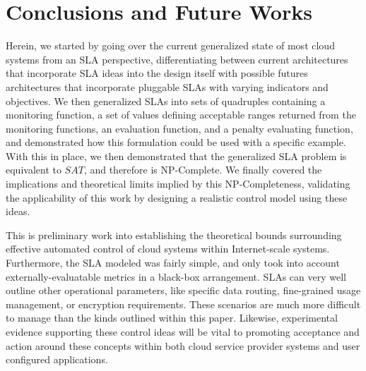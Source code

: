 \section{Conclusions and Future Works}
Herein, we started by going over the current generalized state of most cloud systems from an SLA perspective, differentiating between current architectures that incorporate SLA ideas into the design itself with possible futures architectures that incorporate pluggable SLAs with varying indicators and objectives.  We then generalized SLAs into sets of quadruples containing a monitoring function, a set of values defining acceptable ranges returned from the monitoring functions, an evaluation function, and a penalty evaluating function, and demonstrated how this formulation could be used with a specific example.  With this in place, we then demonstrated that the generalized SLA problem is equivalent to $ SAT $, and therefore is NP-Complete.  We finally covered the implications and theoretical limits implied by this NP-Completeness, validating the applicability of this work by designing a realistic control model using these ideas.

This is preliminary work into establishing the theoretical bounds surrounding effective automated control of cloud systems within Internet-scale systems.  Furthermore, the SLA modeled was fairly simple, and only took into account externally-evaluatable metrics in a black-box arrangement.  SLAs can very well outline other operational parameters, like specific data routing, fine-grained usage management, or encryption requirements.  These scenarios are much more difficult to manage than the kinds outlined within this paper.  Likewise, experimental evidence supporting these control ideas will be vital to promoting acceptance and action around these concepts within both cloud service provider systems and user configured applications.